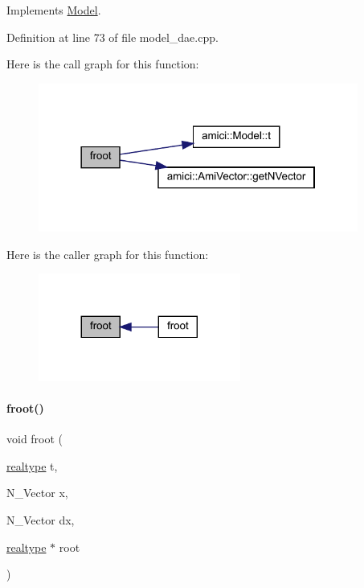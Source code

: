 Implements \mbox{\hyperlink{classamici_1_1_model_a9124751917d81611cc237c853d9cf6b6}{Model}}.



Definition at line 73 of file model\+\_\+dae.\+cpp.

Here is the call graph for this function\+:
\nopagebreak
\begin{figure}[H]
\begin{center}
\leavevmode
\includegraphics[width=298pt]{classamici_1_1_model___d_a_e_a94a623b51fd0ecd7a9a549eb7da2fc04_cgraph}
\end{center}
\end{figure}
Here is the caller graph for this function\+:
\nopagebreak
\begin{figure}[H]
\begin{center}
\leavevmode
\includegraphics[width=188pt]{classamici_1_1_model___d_a_e_a94a623b51fd0ecd7a9a549eb7da2fc04_icgraph}
\end{center}
\end{figure}
\mbox{\label{classamici_1_1_model___d_a_e_ae6c3d021c2ba942652b6dbd4355e8968}} 
\paragraph{\texorpdfstring{froot()}{froot()}\hspace{0.1cm}{\footnotesize\ttfamily [2/3]}}
{\footnotesize\ttfamily void froot (\begin{DoxyParamCaption}\item[{\mbox{\hyperlink{namespaceamici_a1bdce28051d6a53868f7ccbf5f2c14a3}{realtype}}}]{t,  }\item[{N\+\_\+\+Vector}]{x,  }\item[{N\+\_\+\+Vector}]{dx,  }\item[{\mbox{\hyperlink{namespaceamici_a1bdce28051d6a53868f7ccbf5f2c14a3}{realtype}} $\ast$}]{root }\end{DoxyParamCaption})}

